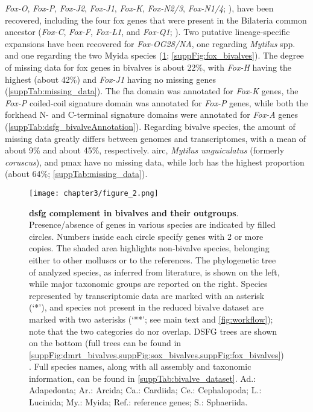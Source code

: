 \textit{Fox-O}, \textit{Fox-P}, \textit{Fox-J2}, \textit{Fox-J1}, \textit{Fox-K}, \textit{Fox-N2/3}, \textit{Fox-N1/4}; ), have been recovered, including the four \gls{fox} genes that were present in the Bilateria common ancestor (\textit{Fox-C}, \textit{Fox-F}, \textit{Fox-L1}, and \textit{Fox-Q1}; ). Two putative lineage-specific expansions have been recovered for \textit{Fox-OG28/NA}, one regarding \textit{Mytilus} spp. and one regarding the two Myida species (\cref{fig:DSFG_bivalveCompilation}; \cref{suppFig:fox_bivalves}). The degree of missing data for \gls{fox} genes in bivalves is about 22\%, with \textit{Fox-H} having the highest (about 42\%) and \textit{Fox-J1} having no missing genes (\cref{suppTab:missing_data}). The \gls{fha} domain was annotated for \textit{Fox-K} genes, the \textit{Fox-P} coiled-coil signature domain was annotated for \textit{Fox-P} genes, while both the forkhead N- and C-terminal signature domains were annotated for \textit{Fox-A} genes (\cref{suppTab:dsfg_bivalveAnnotation}).
Regarding bivalve species, the amount of missing data greatly differs between genomes and transcriptomes, with a mean of about 9\% and about 45\%, respectively. \gls{airc}, \textit{Mytilus unguiculatus} (formerly \textit{coruscus}), and \gls{pmax} have no missing data, while \gls{lorb} has the highest proportion (about 64\%; \cref{suppTab:missing_data}).

\begin{figure}
	\centering
	\texttt{[image: chapter3/figure\_2.png]}
	
	\caption[\textbf{\gls{dsfg} complement in bivalves and their outgroups}]
	{
		\textbf{\gls{dsfg} complement in bivalves and their outgroups}. Presence/absence of genes in various species are indicated by filled circles. Numbers inside each circle specify genes with 2 or more copies. The shaded area highlights non-bivalve species, belonging either to other molluscs or to the references. The phylogenetic tree of analyzed species, as inferred from literature, is shown on the left, while major taxonomic groups are reported on the right. Species represented by transcriptomic data are marked with an asterisk (‘*’), and species not present in the reduced bivalve dataset are marked with two asterisks (‘**’; see main text and \cref{fig:workflow}); note that the two categories do nor overlap. DSFG trees are shown on the bottom (full trees can be found in \cref{suppFig:dmrt_bivalves,suppFig:sox_bivalves,suppFig:fox_bivalves}). Full species names, along with all assembly and taxonomic information, can be found in \cref{suppTab:bivalve_dataset}.  Ad.: Adapedonta; Ar.: Arcida; Ca.: Cardiida; Ce.: Cephalopoda; L.: Lucinida; My.: Myida; Ref.: reference genes; S.: Sphaeriida.
	}
	\label{fig:DSFG_bivalveCompilation}
\end{figure}

